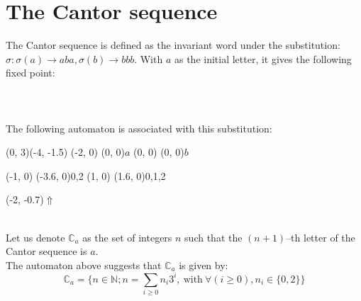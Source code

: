 \documentclass{article}
\begin{document}
\section*{The Cantor sequence}
The Cantor sequence is defined as the invariant word under the substitution: 
$\sigma: \sigma(a) \to aba, \sigma(b) \to bbb$. With $a$ as the
initial letter, it gives the following fixed point:\\
\\
\\
\\
The following automaton is associated with this
substitution:\\
\begin{graph}(0, 3)(-4, -1.5)
  (-2, 0) (0, 0){$a$}
  (0, 0)  (0, 0){$b$}

  (-1, 0) \freetext(-3.6, 0){0,2}
   
  (1, 0) \freetext(1.6, 0){0,1,2}

  \freetext(-2, -0.7){$\Uparrow$}
\end{graph}\\
Let us denote $\mathbb{C}_a$ as the set of integers $n$ such that the
$(n + 1)$--th letter of the Cantor sequence is $a$.\\
The automaton above suggests that $\mathbb{C}_a$ is given by:
\begin{displaymath}
  \mathbb{C}_a = \Big\{n \in \mathbb{N}; n = \sum_{i \ge 0} n_i3^i,
  \mathrm{\ with\ } \forall(i \ge 0), n_i \in \{0, 2\}\Big\}
\end{displaymath}
\end{document}
